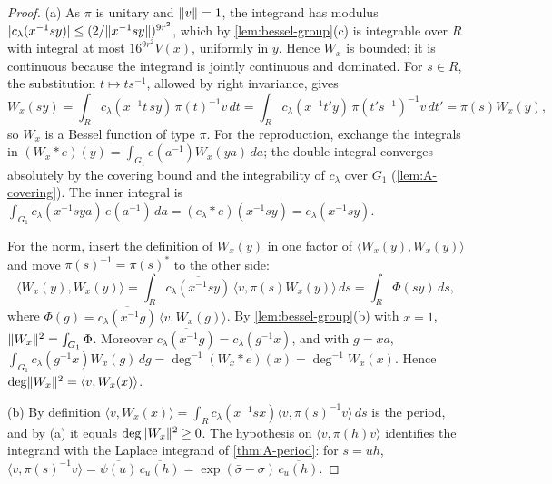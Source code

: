 \begin{proof}
(a) As $\pi$ is unitary and $\lVert v\rVert=1$, the integrand has modulus $\lvert c_\lambda(x^{-1}sy)\rvert\le(2/\lVert x^{-1}sy\rVert)^{9r^2}$, which by \cref{lem:bessel-group}(c) is integrable over $R$ with integral at most $16^{9r^2}V(x)$,
uniformly in $y$. Hence $W_x$ is bounded; it is continuous because the integrand is jointly continuous and dominated. For $s\in R$, the substitution $t\mapsto ts^{-1}$, allowed by right invariance, gives
\[
  W_x(sy)=\int_Rc_\lambda(x^{-1}t\,sy)\,\pi(t)^{-1}v\,dt=\int_Rc_\lambda(x^{-1}t'y)\,\pi(t's^{-1})^{-1}v\,dt'=\pi(s)W_x(y),
\]
so $W_x$ is a Bessel function of type $\pi$. For the reproduction, exchange the integrals in $(W_x*e)(y)=\int_{G_1}e(a^{-1})W_x(ya)\,da$; the double integral converges absolutely by the covering bound and the
integrability of $c_\lambda$ over $G_1$ (\cref{lem:A-covering}). The inner integral is $\int_{G_1}c_\lambda(x^{-1}sya)\,e(a^{-1})\,da=(c_\lambda*e)(x^{-1}sy)=c_\lambda(x^{-1}sy)$.

For the norm, insert the definition of $W_x(y)$ in one factor of $\langle W_x(y),W_x(y)\rangle$ and move $\pi(s)^{-1}=\pi(s)^*$ to the other side:
\[
  \langle W_x(y),W_x(y)\rangle=\int_R\overline{c_\lambda(x^{-1}sy)}\,\langle v,\pi(s)W_x(y)\rangle\,ds=\int_R\Phi(sy)\,ds,
\]
where $\Phi(g)=\overline{c_\lambda(x^{-1}g)}\,\langle v,W_x(g)\rangle$.
By \cref{lem:bessel-group}(b) with $x=1$, $\lVert W_x\rVert^2=\int_{G_1}\Phi$. Moreover $\overline{c_\lambda(x^{-1}g)}=c_\lambda(g^{-1}x)$, and with $g=xa$, $\int_{G_1}c_\lambda(g^{-1}x)W_x(g)\,dg=\deg^{-1}(W_x*e)(x)=\deg^{-1}W_x(x)$. Hence
$\deg\lVert W_x\rVert^2=\langle v,W_x(x)\rangle$.

(b) By definition $\langle v,W_x(x)\rangle=\int_Rc_\lambda(x^{-1}sx)\langle v,\pi(s)^{-1}v\rangle\,ds$ is the period, and by (a) it equals $\deg\lVert W_x\rVert^2\ge0$. The hypothesis on $\langle v,\pi(h)v\rangle$ identifies the integrand with the Laplace
integrand of \cref{thm:A-period}: for $s=uh$, $\langle v,\pi(s)^{-1}v\rangle=\overline{\psi(u)}\,\overline{c_u(h)}=\exp(\bar\sigma-\sigma)\,\overline{c_u(h)}$.


\end{proof}

